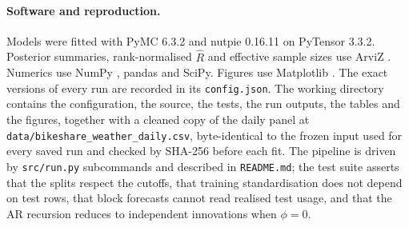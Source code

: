 \documentclass{article}
\begin{document}
\paragraph{Software and reproduction.}
Models were fitted with PyMC 6.3.2 \citep{abrilpla2023pymc} and nutpie 0.16.11 \citep{nutpie} on
PyTensor 3.3.2. Posterior summaries, rank-normalised $\hat{R}$ and effective sample sizes use ArviZ
\citep{kumar2019arviz}. Numerics use NumPy \citep{harris2020numpy}, pandas \citep{mckinney2010pandas}
and SciPy. Figures use Matplotlib \citep{hunter2007matplotlib}. The exact versions of every run are
recorded in its \texttt{config.json}. The working directory contains the configuration, the source,
the tests, the run outputs, the tables and the figures, together with a cleaned copy of the daily
panel at \texttt{data/bikeshare\_weather\_daily.csv}, byte-identical to the frozen input used for
every saved run and checked by SHA-256 before each fit. The pipeline is driven by \texttt{src/run.py}
subcommands and described in \texttt{README.md}; the test suite asserts that the splits respect the
cutoffs, that training standardisation does not depend on test rows, that block forecasts cannot read
realised test usage, and that the AR recursion reduces to independent innovations when $\phi=0$.
\end{document}
